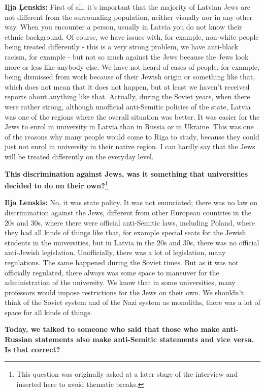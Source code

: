 \textbf{Iļja Ļenskis:} First of all, it's important that the majority of Latvian Jews are not different from the surrounding population, neither visually nor in any other way. When you encounter a person, usually in Latvia you do not know their ethnic background. Of course, we have issues with, for example, non-white people being treated differently - this is a very strong problem, we have anti-black racism, for example - but not so much against the Jews because the Jews look more or less like anybody else. We have not heard of cases of people, for example, being dismissed from work because of their Jewish origin or something like that, which does not mean that it does not happen, but at least we haven't received reports about anything like that. Actually, during the Soviet years, when there were rather strong, although unofficial anti-Semitic policies of the state, Latvia was one of the regions where the overall situation was better. It was easier for the Jews to enrol in university in Latvia than in Russia or in Ukraine. This was one of the reasons why many people would come to Riga to study, because they could just not enrol in university in their native region. I can hardly say that the Jews will be treated differently on the everyday level. 

\textbf{This discrimination against Jews, was it something that universities decided to do on their own?\footnote{This question was originally asked at a later stage of the interview and inserted here to avoid thematic breaks.}} 

\textbf{Ilja Lenskis:} No, it was state policy. 
It was not enunciated; there was no law on discrimination against the Jews, different from other European countries in the 20s and 30s, where there were official anti-Semitic laws, including Poland, where they had all kinds of things like that, for example special seats for the Jewish students in the universities, but in Latvia in the 20s and 30s, there was no official anti-Jewish legislation. Unofficially, there was a lot of legislation, many regulations. The same happened during the Soviet times. But as it was not officially regulated, there always was some space to maneuver for the administration of the university. We know that in some universities, many professors would impose restrictions for the Jews on their own. We shouldn't think of the Soviet system and of the Nazi system as monoliths, there was a lot of space for all kinds of things. 

\textbf{Today, we talked to someone who said that those who make anti-Russian statements also make anti-Semitic statements and vice versa. Is that correct?}

